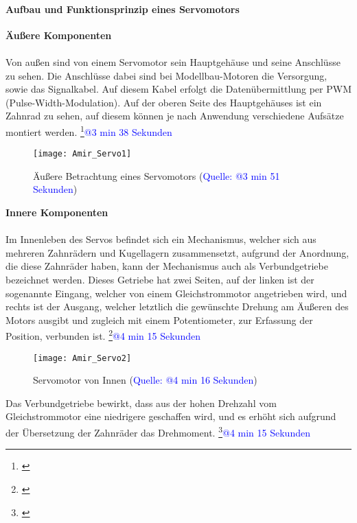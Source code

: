 \documentclass[titlepage,12pt,twoside]{article}
\begin{document}
\paragraph{Aufbau und Funktionsprinzip eines Servomotors}
\label{par:Aufbau und Funktionsprinzip eines Servomotors}
\hfill \break
\hfill \break
\textbf{Äußere Komponenten} \\
\\
Von außen sind von einem Servomotor sein Hauptgehäuse und seine 
Anschlüsse zu sehen. Die Anschlüsse dabei sind bei Modellbau-Motoren 
die Versorgung, sowie das Signalkabel. Auf diesem Kabel erfolgt die 
Datenübermittlung per PWM (Pulse-Width-Modulation). Auf der oberen Seite 
des Hauptgehäuses ist ein Zahnrad zu sehen, auf diesem können je nach 
Anwendung verschiedene Aufsätze montiert werden. \footnote{\cite{Q1}}\textcolor{blue}{@3 min 38 Sekunden} \\
\begin{figure}[H]
	\begin{center}
		\scalebox{1.2}
		{\texttt{[image: Amir\_Servo1]}}
		\caption{Äußere Betrachtung eines Servomotors (\textcolor{blue}{Quelle: \cite{Q8}@3 min 51 Sekunden})}
		\label{fig:Amir_Servo1}
	\end{center}
\end{figure}
\hfill \break
\textbf{Innere Komponenten} \\
\\
Im Innenleben des Servos befindet sich ein Mechanismus, welcher sich aus 
mehreren Zahnrädern und Kugellagern zusammensetzt, aufgrund der 
Anordnung, die diese Zahnräder haben, kann der Mechanismus auch als 
Verbundgetriebe bezeichnet werden. Dieses Getriebe hat zwei Seiten, auf 
der linken ist der sogenannte Eingang, welcher von einem Gleichstrommotor 
angetrieben wird, und rechts ist der Ausgang, welcher letztlich die 
gewünschte Drehung am Äußeren des Motors ausgibt und zugleich mit einem 
Potentiometer, zur Erfassung der Position, verbunden ist. \footnote{\cite{Q8}}\textcolor{blue}{@4 min 15 Sekunden} \\
\begin{figure}[H]
	\begin{center}
		\scalebox{1.2}
		{\texttt{[image: Amir\_Servo2]}}
		\caption{Servomotor von Innen (\textcolor{blue}{Quelle: \cite{Q8}@4 min 16 Sekunden})}
		\label{fig:Amir_Servo2}
	\end{center}
\end{figure}
\hfill \break
Das Verbundgetriebe bewirkt, dass aus der hohen Drehzahl vom 
Gleichstrommotor eine niedrigere geschaffen wird, und es erhöht sich 
aufgrund der Übersetzung der Zahnräder das Drehmoment. \footnote{\cite{Q8}}\textcolor{blue}{@4 min 15 Sekunden} \\
\end{document}
